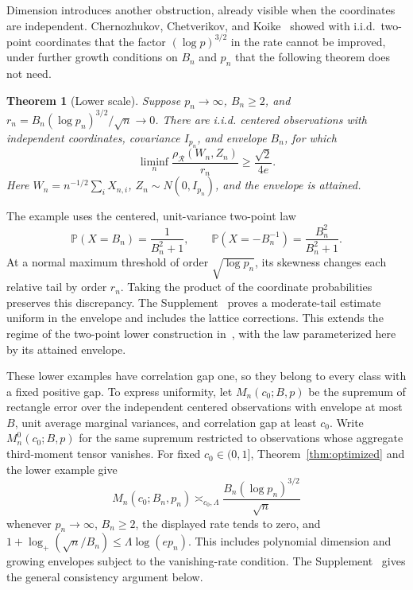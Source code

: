 \documentclass[11pt,letterpaper]{article}
\newif\ifshowpolish
\newcommand{\polish}[1]{\ifshowpolish{\color{magenta}%
\hypersetup{linkcolor=magenta,citecolor=magenta,urlcolor=magenta}#1}\else#1\fi}
\newif\ifshowrev
\newcommand{\rev}[1]{\ifshowrev{\color{revblue}%
\hypersetup{linkcolor=revblue,citecolor=revblue,urlcolor=revblue}#1}\else#1\fi}
\newcommand{\rs}[1]{\ifshowrev{\color{revblue}#1}\else#1\fi}
\newif\ifshowpass
\newcommand{\pass}[1]{\ifshowpass{\color{revblue}%
\hypersetup{linkcolor=revblue,citecolor=revblue,urlcolor=revblue}#1}\else#1\fi}
\newtheorem{theorem}{Theorem}
\theoremstyle{remark}
\newcommand{\Pp}{\mathbb P}
\newcommand{\rh}{\rho_{\mathcal R}}
\begin{document}
Dimension introduces another obstruction, already visible when the
coordinates are independent. \pass{Chernozhukov, Chetverikov, and
Koike~\cite[Proposition~2.1]{CCK} showed with i.i.d.\ two-point
coordinates that the factor \((\log p)^{3/2}\) in the rate cannot be
improved, under further growth conditions on \(B_n\) and \(p_n\) that the
following theorem does not need.}
\begin{theorem}[Lower scale]\label{opt:skew-lower}
Suppose \(p_n\to\infty\), \(B_n\ge2\), and
\(r_n=B_n(\log p_n)^{3/2}/\sqrt n\to0\). There are i.i.d.
centered observations with independent coordinates, covariance
\(I_{p_n}\), and envelope \(B_n\), for which
\begin{equation}
 \liminf_n\frac{\rh(W_n,Z_n)}{r_n}\ge\frac{\sqrt2}{4e}.
 \label{opt:lower-constant}
\end{equation}
Here \(W_n=n^{-1/2}\sum_iX_{n,i}\),
\(Z_n\sim N(0,I_{p_n})\), and the envelope is attained.
\end{theorem}
The example uses the centered, unit-variance two-point law
\[
 \Pp(X=B_n)=\frac1{B_n^2+1},\qquad
 \Pp(X=-B_n^{-1})=\frac{B_n^2}{B_n^2+1}.
\]
At a normal maximum threshold of order \(\sqrt{\log p_n}\), its
skewness changes each relative tail by order \(r_n\). Taking the
product of the coordinate probabilities preserves this discrepancy.
\polish{The Supplement~\cite[Section~S.4.1, Theorem~S.3 and Lemma~S.2]{Supplement}
proves a moderate-tail estimate uniform in the envelope and includes the
lattice corrections. This extends the regime of the two-point lower
construction in~\cite[Proposition~2.1]{CCK}, with the law parameterized here
by its attained envelope.}

\rev{These lower examples have correlation gap one, so they belong to
every class with a fixed positive gap.} To express uniformity,
let \(M_n(c_0;B,p)\) be the supremum of rectangle error over the
independent centered observations with envelope at most \(B\), unit
average marginal variances, and correlation gap at least \(c_0\).
Write \(M_n^0(c_0;B,p)\) for the same supremum restricted to
\pass{observations whose aggregate third-moment tensor vanishes}.
For fixed \(c_0\in(0,1]\), Theorem~\ref{thm:optimized} and the lower
example give
\begin{equation}
 M_n(c_0;B_n,p_n)\asymp_{c_0,\rs\Lambda}
 \frac{B_n(\log p_n)^{3/2}}{\sqrt n}
 \label{opt:matching-minimax}
\end{equation}
whenever \(p_n\to\infty\), \(B_n\ge2\), the displayed rate tends
to zero, and \(1+\log_+(\sqrt n/B_n)\le\rs\Lambda\log(ep_n)\).
\polish{This includes polynomial dimension and growing envelopes subject to
the vanishing-rate condition. The Supplement~\cite[Section~S.4.2,
Theorem~S.4]{Supplement} gives the general consistency argument below.}
\end{document}
